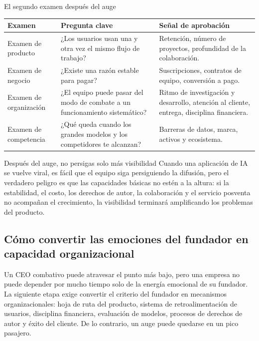 \documentclass[a4paper]{article}
\begin{document}
\begin{knowledgebox}{El segundo examen después del auge}
\begin{tabularx}{\textwidth}{p{}p{}X}
\toprule
Examen & Pregunta clave & Señal de aprobación \\
\midrule
Examen de producto & ¿Los usuarios usan una y otra vez el mismo flujo de trabajo? & Retención, número de proyectos, profundidad de la colaboración. \\
Examen de negocio & ¿Existe una razón estable para pagar? & Suscripciones, contratos de equipo, conversión a pago. \\
Examen de organización & ¿El equipo puede pasar del modo de combate a un funcionamiento sistemático? & Ritmo de investigación y desarrollo, atención al cliente, entrega, disciplina financiera. \\
Examen de competencia & ¿Qué queda cuando los grandes modelos y los competidores te alcanzan? & Barreras de datos, marca, activos y ecosistema. \\
\bottomrule
\end{tabularx}
\end{knowledgebox}

\begin{warningbox}{Después del auge, no persigas solo más visibilidad}
Cuando una aplicación de IA se vuelve viral, es fácil que el equipo siga persiguiendo la difusión, pero el verdadero peligro es que las capacidades básicas no estén a la altura: si la estabilidad, el costo, los derechos de autor, la colaboración y el servicio posventa no acompañan el crecimiento, la visibilidad terminará amplificando los problemas del producto.
\end{warningbox}

\subsection{Cómo convertir las emociones del fundador en capacidad organizacional}

Un CEO combativo puede atravesar el punto más bajo, pero una empresa no puede depender por mucho tiempo solo de la energía emocional de su fundador. La siguiente etapa exige convertir el criterio del fundador en mecanismos organizacionales: hoja de ruta del producto, sistema de retroalimentación de usuarios, disciplina financiera, evaluación de modelos, procesos de derechos de autor y éxito del cliente. De lo contrario, un auge puede quedarse en un pico pasajero.
\end{document}
